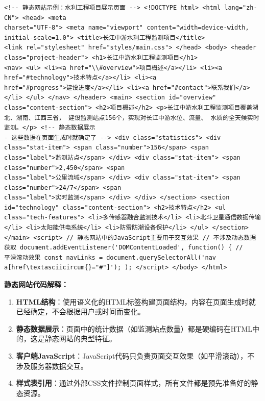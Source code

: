 \begin{lstlisting}[style=xml] <!-- 静态网站示例：水利工程项目展示页面 --> <!DOCTYPE html> <html lang="zh-CN"> <head> <meta
charset="UTF-8"> <meta name="viewport" content="width=device-width, initial-scale=1.0"> <title>长江中游水利工程监测项目</title>
<link rel="stylesheet" href="styles/main.css"> </head> <body> <header class="project-header"> <h1>长江中游水利工程监测项目</h1>
<nav> <ul> <li><a href="\\#overview">项目概述</a></li> <li><a href="#technology">技术特点</a></li> <li><a
href="#progress">建设进度</a></li> <li><a href="#contact">联系我们</a></li> </ul> </nav> </header> <main> <section id="overview"
class="content-section"> <h2>项目概述</h2> <p>长江中游水利工程监测项目覆盖湖北、湖南、江西三省， 建设监测站点156个，实现对长江中游水位、流量、 水质的全天候实时监测。</p> <!-- 静态数据展示
- 这些数据在页面生成时就确定了 --> <div class="statistics"> <div class="stat-item"> <span class="number">156</span> <span
class="label">监测站点</span> </div> <div class="stat-item"> <span class="number">2,450</span> <span
class="label">公里流域</span> </div> <div class="stat-item"> <span class="number">24/7</span> <span
class="label">实时监测</span> </div> </div> </section> <section id="technology" class="content-section"> <h2>技术特点</h2> <ul
class="tech-features"> <li>多传感器融合监测技术</li> <li>北斗卫星通信数据传输</li> <li>太阳能供电系统</li> <li>防雷防潮设备保护</li> </ul> </section>
</main> <script> // 静态网站中的JavaScript主要用于交互效果 // 不涉及动态数据获取 document.addEventListener('DOMContentLoaded', function() { //
平滑滚动效果 const navLinks = document.querySelectorAll('nav a[href\textasciicircum{}="#"]'); ); </script> </body> </html>
\end{lstlisting} \textbf{静态网站代码解释：} \begin{enumerate} \def\labelenumi{\arabic{enumi}.} \item
\textbf{HTML结构}：使用语义化的HTML标签构建页面结构，内容在页面生成时就已经确定，不会根据用户或时间而变化。 \item
\textbf{静态数据展示}：页面中的统计数据（如监测站点数量）都是硬编码在HTML中的，这是静态网站的典型特征。 \item
\textbf{客户端JavaScript}：JavaScript代码只负责页面交互效果（如平滑滚动），不涉及服务器数据交互。 \item \textbf{样式表引用}：通过外部CSS文件控制页面样式，所有文件都是预先准备好的静态资源。
\end{enumerate}
